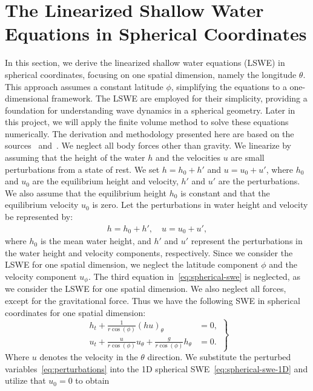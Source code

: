 \section{The Linearized Shallow Water Equations in Spherical Coordinates}
In this section, we derive the linearized shallow water equations (LSWE) in spherical coordinates, focusing on one spatial dimension, namely the longitude $\theta$.
This approach assumes a constant latitude $\phi$, simplifying the equations to a one-dimensional framework.
The LSWE are employed for their simplicity, providing a foundation for understanding wave dynamics in a spherical geometry.
Later in this project, we will apply the finite volume method to solve these equations numerically.
The derivation and methodology presented here are based on the sources~\cite{BONEV_2018} and~\cite{Eskilsson_2005}.
We neglect all body forces other than gravity.
We linearize by assuming that the height of the water $h$ and the velocities $u$ are small perturbations from a state of rest.
We set $h = h_0 + h'$ and $u = u_0 + u'$, where $h_0$ and $u_0$ are the equilibrium height and velocity, $h'$ and $u'$ are the perturbations.
We also assume that the equilibrium height $h_0$ is constant and that the equilibrium velocity $u_0$ is zero.
Let the perturbations in water height and velocity be represented by:
\begin{align}\label{eq:perturbations}
    h = h_0 + h', \quad u = u_0 + u',
\end{align}
where $h_0$ is the mean water height, and $h'$ and $u'$ represent the perturbations in the water height and velocity components, respectively.
Since we consider the LSWE for one spatial dimension, we neglect the latitude component $\phi$ and the velocity component $u_\phi$.
The third equation in~\eqref{eq:spherical-swe} is neglected, as we consider the LSWE for one spatial dimension.
We also neglect all forces, except for the gravitational force.
Thus we have the following SWE in spherical coordinates for one spatial dimension:
\begin{equation}\label{eq:spherical-swe-1D}
    \left.
    \begin{aligned}
        h_t + \frac{1}{r \cos (\phi)}  {(h u)}_{\theta}  &= 0, \\
        {u}_t  + \frac{u}{r \cos (\phi)} {u}_\theta + \frac{g}{r \cos (\phi)} h_\theta  &= 0.
    \end{aligned}
    \right\}
\end{equation}
Where $u$ denotes the velocity in the $\theta$ direction.
We substitute the perturbed variables~\eqref{eq:perturbations} into the 1D spherical SWE~\eqref{eq:spherical-swe-1D} and utilize that $u_0 = 0$ to obtain
